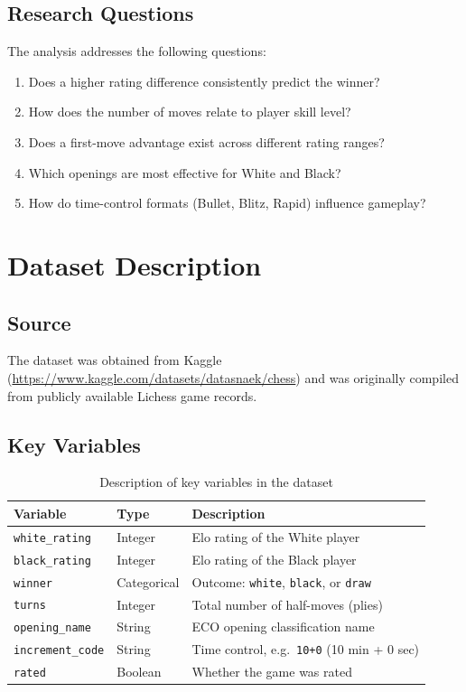 \documentclass[12pt,a4paper]{article}
\begin{document}
\subsection{Research Questions}

The analysis addresses the following questions:
\begin{enumerate}
    \item Does a higher rating difference consistently predict the winner?
    \item How does the number of moves relate to player skill level?
    \item Does a first-move advantage exist across different rating ranges?
    \item Which openings are most effective for White and Black?
    \item How do time-control formats (Bullet, Blitz, Rapid) influence gameplay?
\end{enumerate}

\section{Dataset Description}

\subsection{Source}

The dataset was obtained from Kaggle (\url{https://www.kaggle.com/datasets/datasnaek/chess}) and was originally compiled from publicly available Lichess game records.

\subsection{Key Variables}

\begin{table}[H]
\centering
\caption{Description of key variables in the dataset}
\begin{tabular}{lll}
\toprule
\textbf{Variable} & \textbf{Type} & \textbf{Description} \\
\midrule
\texttt{white\_rating}    & Integer  & Elo rating of the White player \\
\texttt{black\_rating}    & Integer  & Elo rating of the Black player \\
\texttt{winner}           & Categorical & Outcome: \texttt{white}, \texttt{black}, or \texttt{draw} \\
\texttt{turns}            & Integer  & Total number of half-moves (plies) \\
\texttt{opening\_name}    & String   & ECO opening classification name \\
\texttt{increment\_code}  & String   & Time control, e.g.\ \texttt{10+0} (10 min + 0 sec) \\
\texttt{rated}            & Boolean  & Whether the game was rated \\
\bottomrule
\end{tabular}
\end{table}
\end{document}
